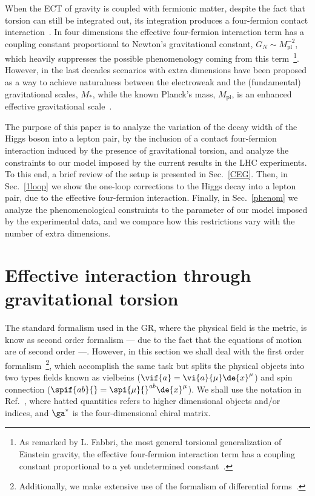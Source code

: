 \documentclass[twocolumn,aps,prd,showkeys,showpacs,groupedaddress,byrevtex]{revtex4-1}
\begin{document}
When the ECT of gravity is coupled with fermionic matter, despite the fact that torsion can still be integrated out, its integration produces a four-fermion contact interaction~\cite{Kibble:1961ba,RevModPhys.48.393,Shapiro:2001rz,SUGRA-book,Castillo-Felisola:2013jva}. In four dimensions the effective four-fermion interaction term has a coupling constant proportional to Newton's gravitational constant, $G_N\sim M_{\text{pl}}^{-2}$, which heavily suppresses the possible phenomenology coming from this term~\footnote{As remarked by L. Fabbri, the most general torsional generalization of Einstein gravity, the effective four-fermion interaction term has a coupling constant proportional to a yet undetermined constant~\cite{Fabbri:2011kq}.}. However, in the last decades scenarios with extra dimensions have been proposed as a way to achieve naturalness between the electroweak and the (fundamental) gravitational scales, $M_*$, while the known Planck's mass, $M_{\text{pl}}$, is an enhanced effective gravitational scale~\cite{ADD1,*AADD,*ADD2,RS1,*RS2}.

The purpose of this paper is to analyze the variation of the decay width of the Higgs boson into a lepton pair, by the inclusion of a contact four-fermion interaction induced by the presence of gravitational torsion, and analyze the constraints to our model imposed by the current results in the LHC experiments. To this end, a brief review of the setup is presented in Sec.~\ref{CEG}. Then, in Sec.~\ref{1loop} we show the one-loop corrections to the Higgs decay into a lepton pair, due to the effective four-fermion interaction. Finally, in Sec.~\ref{phenom} we analyze the phenomenological constraints to the parameter of our model imposed by the experimental data, and we compare how this restrictions vary with the number of extra dimensions.


\section{\label{CEG}Effective interaction through gravitational torsion}

The standard formalism used in the GR, where the physical field is the metric, is know as second order formalism --- due to the fact that the equations of motion are of second order ---. However, in this section we shall deal with the first order formalism~\footnote{Additionally, we make extensive use of the formalism of differential forms~\cite{Cartan-calc,*Zanelli:2005sa}.}, which accomplish the same task but splits the physical objects into two types fields known as vielbeins \mbox{($\vif{a} = \vi{a}{\mu}\de{x}^\mu$)} and spin connection \mbox{($\spif{ab}{} = \spi{\mu}{}^{ab}\de{x}^\mu$).} We shall use the notation in Ref.~\cite{Castillo-Felisola:2013jva,*Castillo-Felisola:2014iia,*Castillo-Felisola:2014xba}, where hatted quantities refers to higher dimensional objects and/or indices, and $\ga^{*}$ is the four-dimensional chiral matrix.
\end{document}
